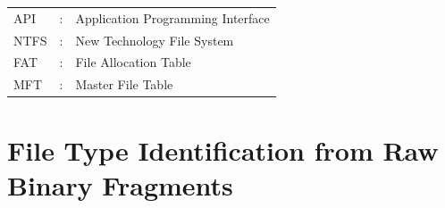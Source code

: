 \documentclass[12pt,a4paper]{report}
\begin{document}
\begin{normalsize}
{\begin{tabular}{lll}
            \vspace{0.1 in}
            API    & : & Application Programming Interface \\
            \vspace{0.1 in}
            NTFS   & : & New Technology File System \\
            \vspace{0.1 in}
            FAT    & : & File Allocation Table \\
            \vspace{0.1 in}
            MFT    & : & Master File Table \\
        \end{tabular}
        \par}
\end{normalsize}

\newpage
\pagestyle{fancy}
\renewcommand{\headrulewidth}{0.5pt}
\renewcommand{\footrulewidth}{0.5pt}



\part{File Type Identification from Raw Binary Fragments}
\label{part:identification}

\end{document}
